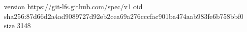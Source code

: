 version https://git-lfs.github.com/spec/v1
oid sha256:87d66d2a4ad9089727d92eb2cea69a276cccfac901ba474aab983fe6b758bbf0
size 3148
